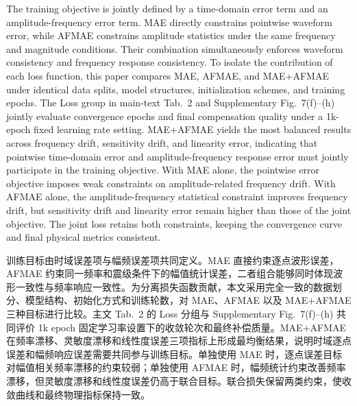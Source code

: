 \documentclass[sn-nature]{sn-jnl}
\newif\ifCNENEnglish
\newif\ifCNENBilingual
\newcommand{\CNEN}[2]{%
    \ifCNENBilingual
        #1%
        \if\relax\detokenize{#2}\relax\else\par #2\fi%
    \else
        \ifCNENEnglish
            #2%
        \else
            #1%
        \fi
    \fi
}
\begin{document}
\CNEN{训练目标由时域误差项与幅频误差项共同定义。MAE 直接约束逐点波形误差，AFMAE 约束同一频率和震级条件下的幅值统计误差，二者组合能够同时体现波形一致性与频率响应一致性。为分离损失函数贡献，本文采用完全一致的数据划分、模型结构、初始化方式和训练轮数，对 MAE、AFMAE 以及 MAE+AFMAE 三种目标进行比较。主文 Tab.~2 的 Loss 分组与 Supplementary Fig.~7(f)--(h) 共同评价 1k epoch 固定学习率设置下的收敛轮次和最终补偿质量。MAE+AFMAE 在频率漂移、灵敏度漂移和线性度误差三项指标上形成最均衡结果，说明时域逐点误差和幅频响应误差需要共同参与训练目标。单独使用 MAE 时，逐点误差目标对幅值相关频率漂移的约束较弱；单独使用 AFMAE 时，幅频统计约束改善频率漂移，但灵敏度漂移和线性度误差仍高于联合目标。联合损失保留两类约束，使收敛曲线和最终物理指标保持一致。}{The training objective is jointly defined by a time-domain error term and an amplitude-frequency error term. MAE directly constrains pointwise waveform error, while AFMAE constrains amplitude statistics under the same frequency and magnitude conditions. Their combination simultaneously enforces waveform consistency and frequency response consistency. To isolate the contribution of each loss function, this paper compares MAE, AFMAE, and MAE+AFMAE under identical data splits, model structures, initialization schemes, and training epochs. The Loss group in main-text Tab.~2 and Supplementary Fig.~7(f)--(h) jointly evaluate convergence epochs and final compensation quality under a 1k-epoch fixed learning rate setting. MAE+AFMAE yields the most balanced results across frequency drift, sensitivity drift, and linearity error, indicating that pointwise time-domain error and amplitude-frequency response error must jointly participate in the training objective. With MAE alone, the pointwise error objective imposes weak constraints on amplitude-related frequency drift. With AFMAE alone, the amplitude-frequency statistical constraint improves frequency drift, but sensitivity drift and linearity error remain higher than those of the joint objective. The joint loss retains both constraints, keeping the convergence curve and final physical metrics consistent.%
}


\clearpage
\end{document}
